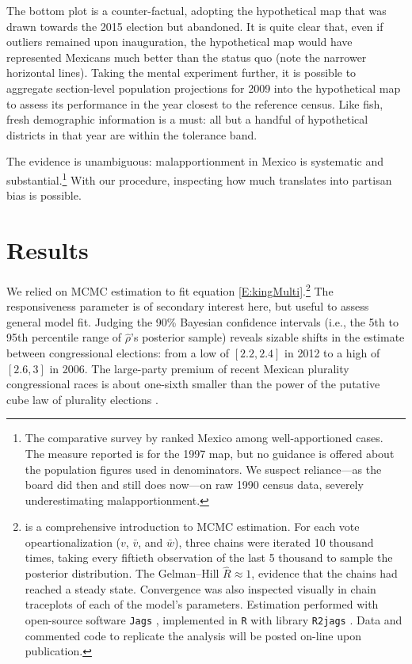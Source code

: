 \documentclass[letter,12pt]{article}
\begin{document}
The bottom plot is a counter-factual, adopting the hypothetical map that was drawn towards the 2015 election but abandoned. It is quite clear that, even if outliers remained upon inauguration, the hypothetical map would have represented Mexicans much better than the status quo (note the narrower horizontal lines). Taking the mental experiment further, it is possible to aggregate section-level population projections for 2009 into the hypothetical map to assess its performance in the year closest to the reference census. Like fish, fresh demographic information is a must: all but a handful of hypothetical districts in that year are within the tolerance band. 

The evidence is unambiguous: malapportionment in Mexico is systematic and substantial.\footnote{The comparative survey by \citet{snyder.samuelsMalapp2004} ranked Mexico among well-apportioned cases. The measure reported is for the 1997 map, but no guidance is offered about the population figures used in denominators. We suspect reliance---as the board did then and still does now---on raw 1990 census data, severely underestimating malapportionment.} With our procedure, inspecting how much translates into partisan bias is possible. 

\section{Results}

We relied on MCMC estimation to fit equation \ref{E:kingMulti}.\footnote{\citet{gelman.hill.2007} is a comprehensive introduction to MCMC estimation. For each vote opeartionalization ($v$, $\bar{v}$, and $\bar{w}$), three chains were iterated 10 thousand times, taking every fiftieth observation of the last 5 thousand to sample the posterior distribution. The Gelman--Hill $\hat{R} \approx 1$, evidence that the chains had reached a steady state. Convergence was also inspected visually in chain traceplots of each of the model's parameters. Estimation performed with open-source software \texttt{Jags} \citep{jags.cite}, implemented in \texttt{R} \citep{r.cite} with library \texttt{R2jags} \citep{r.r2jags}. Data and commented code to replicate the analysis will be posted on-line upon publication.} The responsiveness parameter is of secondary interest here, but useful to assess general model fit. Judging the 90\% Bayesian confidence intervals (i.e., the 5th to 95th percentile range of $\hat{\rho}$'s posterior sample) reveals sizable shifts in the estimate between congressional elections: from a low of $[2.2,2.4]$ in 2012 to a high of $[2.6,3]$ in 2006. The large-party premium of recent Mexican plurality congressional races is about one-sixth smaller than the power of the putative cube law of plurality elections \citep{taagepera.CubeLaw.1973}. 
\end{document}

